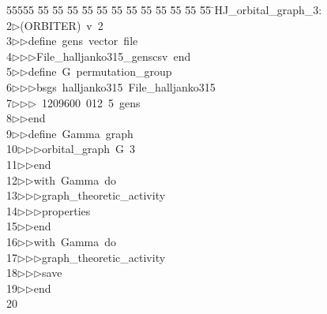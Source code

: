 %
%
\begin{tabbing}
55555 \= 55 \= 55 \= 55 \= 55 \= 55 \= 55 \= 55 \= 55 \= 55 \= 55 \= 55 \= 55 \= \>HJ\_orbital\_graph\_3:\\[0pt]
2\>$\triangleright$\>(ORBITER)\ v\ 2\ \\[0pt]
3\>$\triangleright$\>$\triangleright$\>define\ gens\ vector\ file\ \\[0pt]
4\>$\triangleright$\>$\triangleright$\>$\triangleright$\>File\_halljanko315\_genscsv\ end\ \\[0pt]
5\>$\triangleright$\>$\triangleright$\>define\ G\ permutation\_group\ \\[0pt]
6\>$\triangleright$\>$\triangleright$\>$\triangleright$\>bsgs\ halljanko315\ File\_halljanko315\ \\[0pt]
7\>$\triangleright$\>$\triangleright$\>$\triangleright$\ 1209600\ 012\ 5\ gens\ \\[0pt]
8\>$\triangleright$\>$\triangleright$\>end\ \\[0pt]
9\>$\triangleright$\>$\triangleright$\>define\ Gamma\ graph\ \\[0pt]
10\>$\triangleright$\>$\triangleright$\>$\triangleright$\>orbital\_graph\ G\ 3\ \\[0pt]
11\>$\triangleright$\>$\triangleright$\>end\ \\[0pt]
12\>$\triangleright$\>$\triangleright$\>with\ Gamma\ do\ \\[0pt]
13\>$\triangleright$\>$\triangleright$\>$\triangleright$\>graph\_theoretic\_activity\ \\[0pt]
14\>$\triangleright$\>$\triangleright$\>$\triangleright$\>properties\ \\[0pt]
15\>$\triangleright$\>$\triangleright$\>end\ \\[0pt]
16\>$\triangleright$\>$\triangleright$\>with\ Gamma\ do\ \\[0pt]
17\>$\triangleright$\>$\triangleright$\>$\triangleright$\>graph\_theoretic\_activity\ \\[0pt]
18\>$\triangleright$\>$\triangleright$\>$\triangleright$\>save\ \\[0pt]
19\>$\triangleright$\>$\triangleright$\>end\\[0pt]
20\>\end{tabbing}
